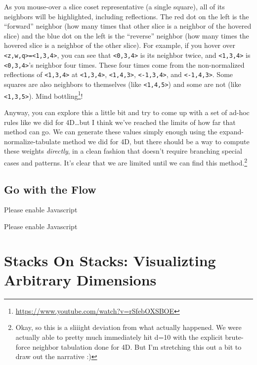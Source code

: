 \documentclass[]{article}
\renewcommand{\href}[2]{#2\footnote{\url{#1}}}
\begin{document}
As you mouse-over a slice coset representative (a single square), all of its
neighbors will be highlighted, including reflections. The red dot on the left is
the ``forward'' neighbor (how many times that other slice is a neighbor of the
hovered slice) and the blue dot on the left is the ``reverse'' neighbor (how
many times the hovered slice is a neighbor of the other slice). For example, if
you hover over
\texttt{\textless{}z,w,q\textgreater{}=\textless{}1,3,4\textgreater{}}, you can
see that \texttt{\textless{}0,3,4\textgreater{}} is its neighbor twice, and
\texttt{\textless{}1,3,4\textgreater{}} is
\texttt{\textless{}0,3,4\textgreater{}}'s neighbor four times. These four times
come from the non-normalized reflections of
\texttt{\textless{}1,3,4\textgreater{}} at
\texttt{\textless{}1,3,4\textgreater{}},
\texttt{\textless{}1,4,3\textgreater{}},
\texttt{\textless{}-1,3,4\textgreater{}}, and
\texttt{\textless{}-1,4,3\textgreater{}}. Some squares are also neighbors to
themselves (like \texttt{\textless{}1,4,5\textgreater{}}) and some are not (like
\texttt{\textless{}1,3,5\textgreater{}}).
\href{https://www.youtube.com/watch?v=rSfebOXSBOE}{Mind bottling}!

Anyway, you can explore this a little bit and try to come up with a set of
ad-hoc rules like we did for 4D\ldots but I think we've reached the limits of
how far that method can go. We can generate these values simply enough using the
expand-normalize-tabulate method we did for 4D, but there should be a way to
compute these weights \emph{directly}, in a clean fashion that doesn't require
branching special cases and patterns. It's clear that we are limited until we
can find this method.\footnote{Okay, so this is a sliiight deviation from what
  actually happened. We were actually able to pretty much immediately hit d=10
  with the explicit brute-force neighbor tabulation done for 4D. But I'm
  stretching this out a bit to draw out the narrative :)}

\hypertarget{go-with-the-flow}{%
\subsection{Go with the Flow}\label{go-with-the-flow}}

\leavevmode\hypertarget{golTreeForward}{}%
Please enable Javascript

\leavevmode\hypertarget{golTreeReverse}{}%
Please enable Javascript

\hypertarget{stacks-on-stacks-visualizting-arbitrary-dimensions}{%
\section{Stacks On Stacks: Visualizting Arbitrary
Dimensions}\label{stacks-on-stacks-visualizting-arbitrary-dimensions}}
\end{document}
